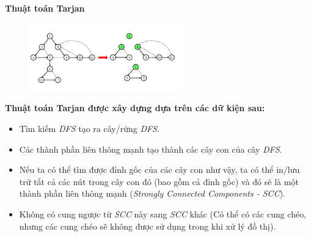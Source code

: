 \documentclass{article}
\begin{document}
\textbf{Thuật toán Tarjan}

\begin{figure}[h]
    \centering
    \includegraphics[width=0.6\textwidth]{img/b5/Depth-First-Search-Tree_img15.png}
\end{figure}

\textbf{Thuật toán Tarjan được xây dựng dựa trên các dữ kiện sau:}
\begin{itemize}
    \item Tìm kiếm \textit{DFS} tạo ra cây/rừng \textit{DFS}.
    \item Các thành phần liên thông mạnh tạo thành các cây con của cây \textit{DFS}.
    \item Nếu ta có thể tìm được đỉnh gốc của các cây con như vậy, ta có thể in/lưu trữ tất cả các nút trong cây con đó (bao gồm cả đỉnh gốc) và đó sẽ là một thành phần liên thông mạnh (\textit{Strongly Connected Components - SCC}).
    \item Không có cung ngược từ \textit{SCC} này sang \textit{SCC} khác (Có thể có các cung chéo, nhưng các cung chéo sẽ không được sử dụng trong khi xử lý đồ thị).
\end{itemize}
\end{document}
